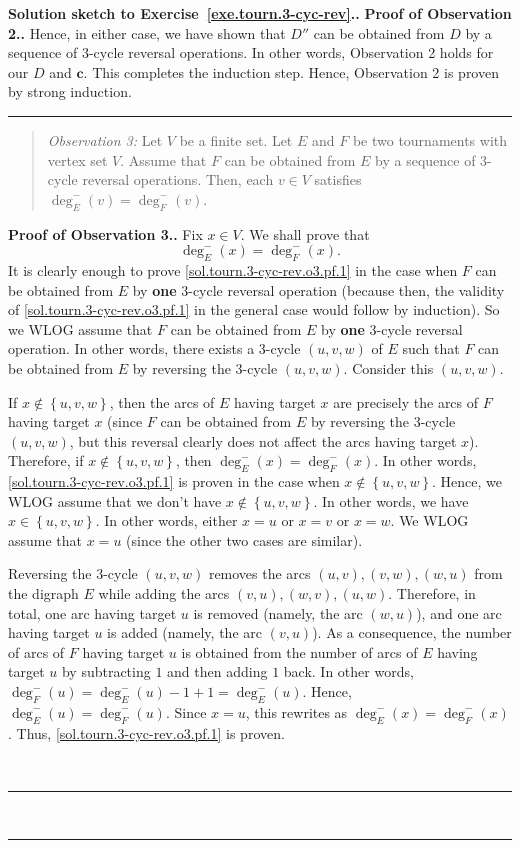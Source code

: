 \documentclass[numbers=enddot,12pt,final,onecolumn,notitlepage]{scrartcl}%
\theoremstyle{definition}
\newenvironment{statement}{\begin{quote}}{\end{quote}}
\newenvironment{proof}[1][Proof]{\noindent\textbf{#1.} }{\ \rule{0.5em}{0.5em}}
\newcommand{\set}[1]{\left\{ #1 \right\}}
\newcommand{\tup}[1]{\left( #1 \right)}
\begin{document}
\begin{proof}[Solution sketch to Exercise~\ref{exe.tourn.3-cyc-rev}.]
\begin{proof}[Proof of Observation 2.]
Hence, in either case, we have shown that
$D''$ can be obtained from $D$ by a sequence of $3$-cycle reversal
operations.
In other words, Observation 2 holds for our $D$ and $\mathbf{c}$. This
completes the induction step. Hence, Observation 2 is proven by
strong induction.
\end{proof}

\begin{statement}
\textit{Observation 3:} Let $V$ be a finite set. Let $E$ and $F$ be
two tournaments with vertex set $V$. Assume that $F$ can be obtained
from $E$ by a sequence of $3$-cycle reversal operations.
Then, each $v \in V$ satisfies $\deg^-_E \tup{v} = \deg^-_F \tup{v}$.
\end{statement}

\begin{proof}[Proof of Observation 3.]
Fix $x \in V$. We shall prove that
\begin{equation}
\deg^-_E \tup{x} = \deg^-_F \tup{x}
.
\label{sol.tourn.3-cyc-rev.o3.pf.1}
\end{equation}
It is clearly enough to prove
\eqref{sol.tourn.3-cyc-rev.o3.pf.1} in the case when $F$ can
be obtained from $E$ by \textbf{one} $3$-cycle reversal operation
(because then, the validity of \eqref{sol.tourn.3-cyc-rev.o3.pf.1}
in the general case would follow by induction). So we
WLOG assume that $F$ can
be obtained from $E$ by \textbf{one} $3$-cycle reversal operation.
In other words, there exists a $3$-cycle $\tup{u, v, w}$ of $E$
such that $F$ can be obtained from $E$ by reversing the $3$-cycle
$\tup{u, v, w}$. Consider this $\tup{u, v, w}$.

If $x \notin \set{u, v, w}$, then the arcs of $E$ having target
$x$ are precisely the arcs of $F$ having target $x$ (since $F$
can be obtained from $E$ by reversing the $3$-cycle
$\tup{u, v, w}$, but this reversal clearly does not affect the
arcs having target $x$). Therefore, if $x \notin \set{u, v, w}$,
then $\deg^-_E \tup{x} = \deg^-_F \tup{x}$. In other words,
\eqref{sol.tourn.3-cyc-rev.o3.pf.1} is proven in the case when
$x \notin \set{u, v, w}$.
Hence, we WLOG assume that we don't have
$x \notin \set{u, v, w}$. In other words, we have
$x \in \set{u, v, w}$. In other words, either $x=u$ or $x=v$ or
$x=w$. We WLOG assume that $x=u$ (since the other two cases are
similar).

Reversing the $3$-cycle $\tup{u, v, w}$ removes the arcs
$\tup{u, v}, \tup{v, w}, \tup{w, u}$ from the digraph $E$ while
adding the arcs $\tup{v, u}, \tup{w, v}, \tup{u, w}$. Therefore, in
total, one arc having target $u$ is removed (namely, the arc
$\tup{w, u}$), and one arc having target $u$ is added (namely, the
arc $\tup{v, u}$). As a consequence, the number of arcs of $F$
having target $u$ is obtained from the number of arcs of $E$ having
target $u$ by subtracting $1$ and then adding $1$ back. In other
words,
$\deg^-_F \tup{u} = \deg^-_E \tup{u} - 1 + 1 = \deg^-_E \tup{u}$.
Hence, $\deg^-_E \tup{u} = \deg^-_F \tup{u}$. Since $x = u$, this
rewrites as $\deg^-_E \tup{x} = \deg^-_F \tup{x}$.
Thus, \eqref{sol.tourn.3-cyc-rev.o3.pf.1} is proven.


\end{proof}
\end{proof}
\end{document}
